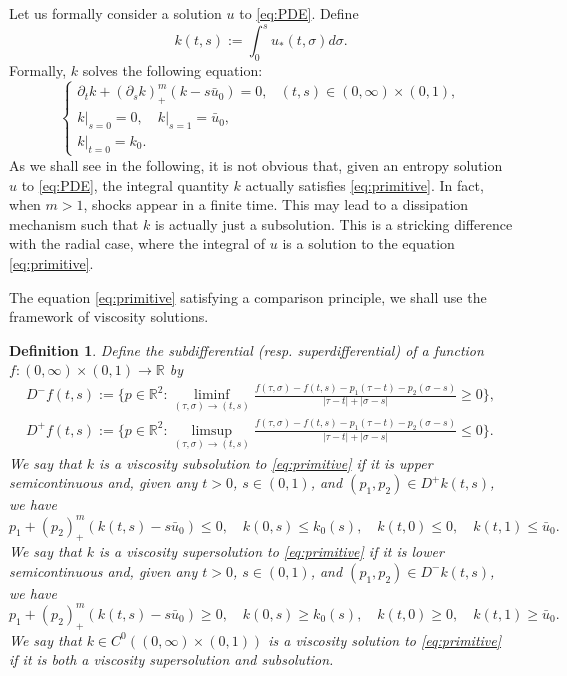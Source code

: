 \documentclass[11pt]{article}
\newtheorem{mydef}[thm]{Definition}
\numberwithin{equation}{section} %
\newcommand{\p}{{\partial}}
\newcommand{\R}{{\mathbb{R}}}
\begin{document}
Let us formally consider a solution $u$ to \eqref{eq:PDE}. Define
\begin{equation*}
    k(t,s ) := \int_0^s u_*(t,\sigma ) d\sigma.
\end{equation*}
Formally, $k$ solves the following equation:
\begin{equation}\label{eq:primitive}
    \begin{cases}
    \p_t k + (\p_s k)^m_+ (k - s\bar u_0) = 0, & (t,s)\in (0,\infty)\times (0,1),\\
    k\vert_{s=0} = 0,\quad  
    k\vert_{s=1} = \bar u_0, \\
    k\vert_{t=0} = k_0.
\end{cases}    
\end{equation}
As we shall see in the following, it is not obvious that, given an entropy solution $u$ to \eqref{eq:PDE}, the integral quantity $k$ actually satisfies \eqref{eq:primitive}. In fact, when $m>1$, shocks appear in a finite time. This may lead to a dissipation mechanism such that $k$ is actually just a subsolution. This is a stricking difference with the radial case, where the integral of $u$ is a solution to the equation \eqref{eq:primitive}. 

The equation \eqref{eq:primitive} satisfying a comparison principle, we shall use the framework of viscosity solutions. 

\begin{mydef}\label{def:viscosity}
    Define the subdifferential (resp. superdifferential) of a function $f:(0,\infty)\times (0,1)\to \R$ by
    \begin{align*}
        D^{-}f(t,s) := \big\{ p\in \R^2 : \liminf_{(\tau,\sigma)\to (t,s)} \frac{f(\tau,\sigma)-f(t,s)-p_1(\tau -t) -p_2 (\sigma- s)}{|\tau -t| + |\sigma-s|} \ge 0\big\}, \\
        D^{+}f(t,s) := \big\{ p\in \R^2 : \limsup_{(\tau,\sigma)\to (t,s)} \frac{f(\tau,\sigma)-f(t,s)-p_1(\tau -t) -p_2 (\sigma- s)}{|\tau -t| + |\sigma-s|}  \le 0\big\} .
    \end{align*}
    We say that $k$ is a viscosity subsolution to \eqref{eq:primitive} if it is upper semicontinuous and, given any $t>0$, $s\in (0,1)$, and $(p_1,p_2)\in D^{+}k(t,s)$, we have 
    \begin{equation*}
        p_1 + (p_2)_+^m (k(t,s)-s\bar u_0) \le 0, \quad k(0,s)\le k_0(s), \quad k(t,0)\le 0,\quad k(t,1) \le \bar u_0.
    \end{equation*}
    We say that $k$ is a viscosity supersolution to \eqref{eq:primitive} if it is lower semicontinuous and, given any $t>0$, $s\in (0,1)$, and $(p_1,p_2)\in D^{-}k(t,s)$, we have 
    \begin{equation*}
        p_1 + (p_2)_+^m (k(t,s)-s\bar u_0) \ge 0, \quad k(0,s)\ge k_0(s), \quad k(t,0)\ge 0,\quad k(t,1) \ge \bar u_0.
    \end{equation*}
    We say that $k\in C^0((0,\infty)\times (0,1))$ is a viscosity solution to \eqref{eq:primitive} if it is both a viscosity supersolution and subsolution.
\end{mydef}
\end{document}
